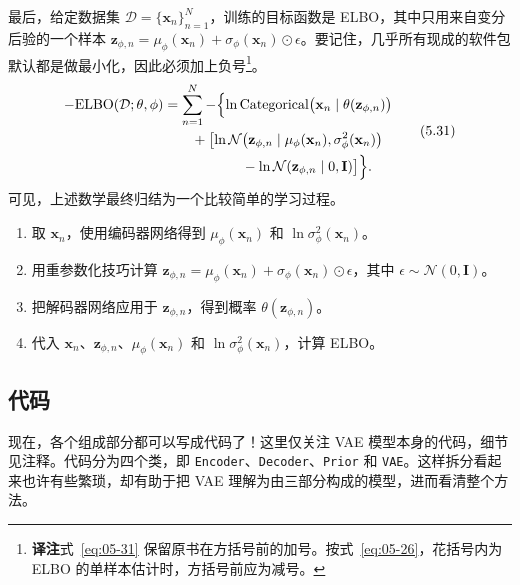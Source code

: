 最后，给定数据集 $\mathcal{D}=\{\mathbf{x}_n\}_{n=1}^N$，训练的目标函数是 ELBO，其中只用来自变分后验的一个样本 $\mathbf{z}_{\phi,n}=\mu_\phi(\mathbf{x}_n)+\sigma_\phi(\mathbf{x}_n)\odot\epsilon$。要记住，几乎所有现成的软件包默认都是做最小化，因此必须加上负号\footnote{\textbf{译注}\quad 式~\eqref{eq:05-31} 保留原书在方括号前的加号。按式~\eqref{eq:05-26}，花括号内为 ELBO 的单样本估计时，方括号前应为减号。}。
\begin{equation}
\begin{aligned}
-\mathrm{ELBO}(\mathcal{D};\theta,\phi)
 &=\sum_{n=1}^N -\Bigl\{
       \ln\operatorname{Categorical}\bigl(\mathbf{x}_n\mid\theta(\mathbf{z}_{\phi,n})\bigr)\\
 &\qquad+\bigl[\ln\mathcal{N}\bigl(\mathbf{z}_{\phi,n}\mid\mu_\phi(\mathbf{x}_n),\sigma_\phi^2(\mathbf{x}_n)\bigr)\\
 &\hspace{5.6em}-\ln\mathcal{N}(\mathbf{z}_{\phi,n}\mid 0,\mathbf{I})\bigr]\Bigr\}.
\end{aligned}
\tag{5.31}\label{eq:05-31}
\end{equation}
可见，上述数学最终归结为一个比较简单的学习过程。
\begin{enumerate}
\item 取 $\mathbf{x}_n$，使用编码器网络得到 $\mu_\phi(\mathbf{x}_n)$ 和 $\ln\sigma_\phi^2(\mathbf{x}_n)$。
\item 用重参数化技巧计算 $\mathbf{z}_{\phi,n}=\mu_\phi(\mathbf{x}_n)+\sigma_\phi(\mathbf{x}_n)\odot\epsilon$，其中 $\epsilon\sim\mathcal{N}(0,\mathbf{I})$。
\item 把解码器网络应用于 $\mathbf{z}_{\phi,n}$，得到概率 $\theta(\mathbf{z}_{\phi,n})$。
\item 代入 $\mathbf{x}_n$、$\mathbf{z}_{\phi,n}$、$\mu_\phi(\mathbf{x}_n)$ 和 $\ln\sigma_\phi^2(\mathbf{x}_n)$，计算 ELBO。
\end{enumerate}

\subsection{代码}
现在，各个组成部分都可以写成代码了！这里仅关注 VAE 模型本身的代码，细节见注释。代码分为四个类，即 \texttt{Encoder}、\texttt{Decoder}、\texttt{Prior} 和 \texttt{VAE}。这样拆分看起来也许有些繁琐，却有助于把 VAE 理解为由三部分构成的模型，进而看清整个方法。


